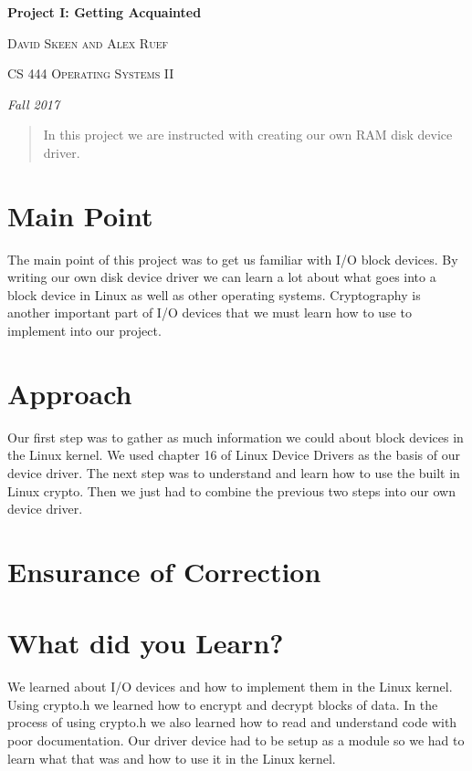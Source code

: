 \documentclass[10pt,drafclsnofoot,onecolumn]{article}
\begin{document}
               
\begin{titlepage}
\centering
{\huge\bfseries Project I: Getting Acquainted\par}
\vspace{.5cm}
{\scshape David Skeen and Alex Ruef \par}
\vspace{.5cm}   
{\scshape CS 444 Operating Systems II\par}
\vspace{.5cm} 
{\Large\itshape Fall 2017\par}
\par
\par
\begin{abstract}
In this project we are instructed with creating our own RAM disk device driver.

\end{abstract}
\end{titlepage}

\section{Main Point}
The main point of this project was to get us familiar with I/O block devices.
By writing our own disk device driver we can learn a lot about what goes into a block device in Linux as well as other operating systems.
Cryptography is another important part of I/O devices that we must learn how to use to implement into our project.

\section{Approach}
Our first step was to gather as much information we could about block devices in the Linux kernel.
We used chapter 16 of Linux Device Drivers as the basis of our device driver.
The next step was to understand and learn how to use the built in Linux crypto.
Then we just had to combine the previous two steps into our own device driver.

\section{Ensurance of Correction}


\section{What did you Learn?}
We learned about I/O devices and how to implement them in the Linux kernel.
Using crypto.h we learned how to encrypt and decrypt blocks of data.
In the process of using crypto.h we also learned how to read and understand code with poor documentation.
Our driver device had to be setup as a module so we had to learn what that was and how to use it in the Linux kernel.
\end{document}
